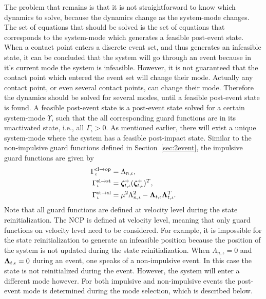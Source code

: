 \documentclass[../DC2017114Bouma.tex]{subfiles}
\begin{document}
The problem that remains is that it is not straightforward to know which dynamics to solve, because the dynamics change as the system-mode changes. The set of equations that should be solved is the set of equations that corresponds to the system-mode which generates a feasible post-event state. When a contact point enters a discrete event set, and thus generates an infeasible state, it can be concluded that the system will go through an event because in it's current mode the system is infeasible. However, it is not guaranteed that the contact point which entered the event set will change their mode. Actually any contact point, or even several contact points, can change their mode. Therefore the dynamics should be solved for several modes, until a feasible post-event state is found. A feasible post-event state is a post-event state solved for a certain system-mode $\Upsilon$, such that the all corresponding guard functions are in its unactivated state, i.e., all $\Gamma_{\iota}>0$. As mentioned earlier, there will exist a unique system-mode where the system has a feasible post-impact state. Similar to the non-impulsive guard functions defined in Section~\ref{sec:2event}, the impulsive guard functions are given by
\begin{align}
\Gamma^{\text{cl}\rightarrow\text{op}}_{\iota} &= \Lambda_{n,\iota},\\
\Gamma^{\text{sl}\rightarrow\text{st}}_{\iota} &= \boldsymbol{\zeta}^+_{t,\iota}(\boldsymbol{\zeta}^+_{t,\iota})^T,\\
\Gamma^{\text{st}\rightarrow\text{sl}}_{\iota} &= \mu^2\Lambda_{n,\iota}^2 - \boldsymbol{\Lambda}_{t,\iota}\boldsymbol{\Lambda}_{t,\iota}^T.
\end{align}
Note that all guard functions are defined at velocity level during the state reinitialization. The NCP is defined at velocity level, meaning that only guard functions on velocity level need to be considered. For example, it is impossible for the state reinitialization to generate an infeasible position because the position of the system is not updated during the state reinitialization. When $\Lambda_{n,\iota} = 0$ and $\boldsymbol{\Lambda}_{t,\iota} = 0$ during an event, one speaks of a non-impulsive event. In this case the state is not reinitialized during the event. However, the system will enter a different mode however. For both impulsive and non-impulsive events the post-event mode is determined during the mode selection, which is described below.
\end{document}
